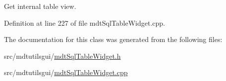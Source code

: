 Get internal table view. 



Definition at line 227 of file mdt\-Sql\-Table\-Widget.\-cpp.



The documentation for this class was generated from the following files\-:\begin{DoxyCompactItemize}
\item 
src/mdtutilsgui/\hyperlink{mdt_sql_table_widget_8h}{mdt\-Sql\-Table\-Widget.\-h}\item 
src/mdtutilsgui/\hyperlink{mdt_sql_table_widget_8cpp}{mdt\-Sql\-Table\-Widget.\-cpp}\end{DoxyCompactItemize}
